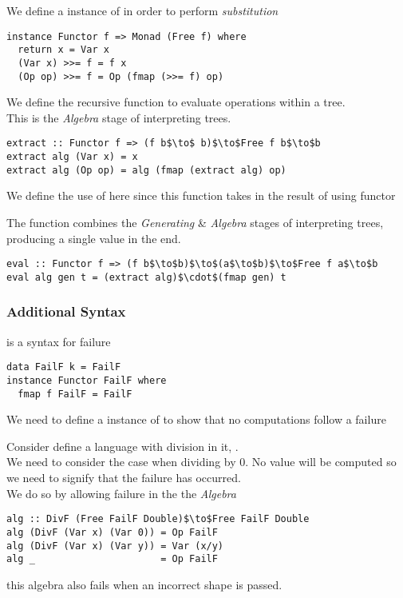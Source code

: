 \documentclass[11pt,a4paper]{article}
\begin{document}
We define a {} instance of {} in order to perform \textit{substitution}
\begin{lstlisting}
instance Functor f => Monad (Free f) where
  return x = Var x
  (Var x) >>= f = f x
  (Op op) >>= f = Op (fmap (>>= f) op)

\end{lstlisting}

We define the recursive function {} to evaluate operations within a {} tree.\\
This is the \textit{Algebra} stage of interpreting {} trees.
\begin{lstlisting}
extract :: Functor f => (f b$\to$ b)$\to$Free f b$\to$b
extract alg (Var x) = x
extract alg (Op op) = alg (fmap (extract alg) op)
\end{lstlisting}
\NB We define the use of {} here since this function takes in the result of using {} functor

The {} function combines the \textit{Generating} \& \textit{Algebra} stages of interpreting {} trees, producing a single value in the end.
\begin{lstlisting}
eval :: Functor f => (f b$\to$b)$\to$(a$\to$b)$\to$Free f a$\to$b
eval alg gen t = (extract alg)$\cdot$(fmap gen) t
\end{lstlisting}

\subsubsection{Additional Syntax}

{} is a syntax for failure
\begin{lstlisting}
data FailF k = FailF
instance Functor FailF where
  fmap f FailF = FailF
\end{lstlisting}
We need to define a {} instance of {} to show that no computations follow a failure

Consider define a language with division in it, {}.\\
We need to consider the case when dividing by $0$. No value will be computed so we need to signify that the failure has occurred.\\
We do so by allowing failure in the the \textit{Algebra}
\begin{lstlisting}
alg :: DivF (Free FailF Double)$\to$Free FailF Double
alg (DivF (Var x) (Var 0)) = Op FailF
alg (DivF (Var x) (Var y)) = Var (x/y)
alg _                      = Op FailF
\end{lstlisting}
\NB this algebra also fails when an incorrect {} shape is passed.\\
\end{document}
